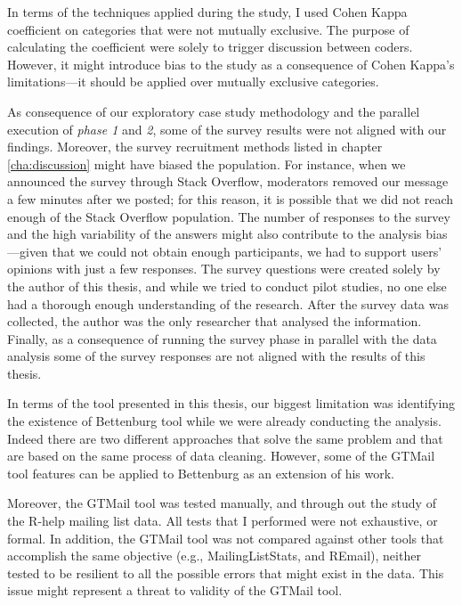 \documentclass{sig-alternate-05-2015}
\begin{document}
	In terms of the techniques applied during the study, I used Cohen Kappa coefficient on categories that were not mutually exclusive. 
	The purpose of calculating the coefficient were solely to trigger discussion between coders. 
	However, it might introduce bias to the study as a consequence of Cohen Kappa's limitations---it should be applied over mutually exclusive categories.

	As consequence of our exploratory case study methodology and the parallel execution of \textit{phase 1} and \textit{2}, some of the survey results were not aligned with our findings. 
	Moreover, the survey recruitment methods listed in chapter \ref{cha:discussion} might have biased the population. 
	For instance, when we announced the survey through Stack Overflow, moderators removed our message a few minutes after we posted; for this reason, it is possible that we did not reach enough of the Stack Overflow population.
	The number of responses to the survey and the high variability of the answers might also contribute to the analysis bias---given that we could not obtain enough participants, we had to support users' opinions with just a few responses.  
	The survey questions were created solely by the author of this thesis, and while we tried to conduct pilot studies, no one else had a thorough enough understanding of the research. 
	After the survey data was collected, the author was the only researcher that analysed the information.
	Finally, as a consequence of running the survey phase in parallel with the data analysis some of the survey responses are not aligned with the results of this thesis.

	In terms of the tool presented in this thesis, our biggest limitation was identifying the existence of Bettenburg tool while we were already conducting the analysis.
	Indeed there are two different approaches that solve the same problem and that are based on the same process of data cleaning.
	However, some of the GTMail tool features can be applied to Bettenburg as an extension of his work.

	Moreover, the GTMail tool was tested manually, and through out the study of the R-help mailing list data.
	All tests that I performed were not exhaustive, or formal.
	In addition, the GTMail tool was not compared against other tools that accomplish the same objective (e.g., MailingListStats, and REmail), neither tested to be resilient to all the possible errors that might exist in the data.
	This issue might represent a threat to validity of the GTMail tool.
\end{document}
